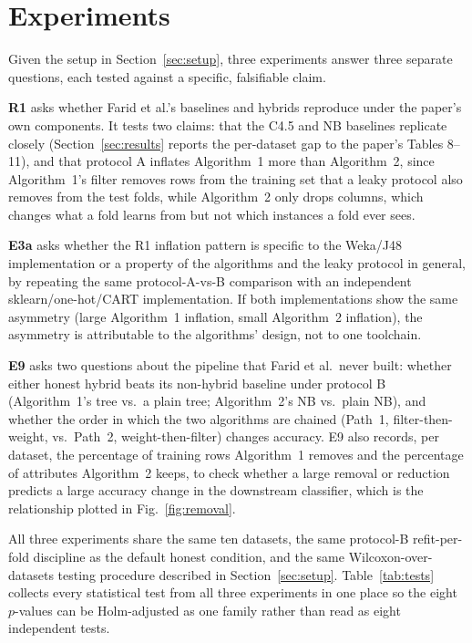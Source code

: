 \section{Experiments}
\label{sec:experiments}

Given the setup in Section~\ref{sec:setup}, three experiments answer three
separate questions, each tested against a specific, falsifiable claim.

\textbf{R1} asks whether Farid et al.'s baselines and hybrids reproduce
under the paper's own components. It tests two claims: that the C4.5 and
NB baselines replicate closely (Section~\ref{sec:results} reports the
per-dataset gap to the paper's Tables 8--11), and that protocol A inflates
Algorithm~1 more than Algorithm~2, since Algorithm~1's filter removes rows
from the training set that a leaky protocol also removes from the test
folds, while Algorithm~2 only drops columns, which changes what a fold
learns from but not which instances a fold ever sees.

\textbf{E3a} asks whether the R1 inflation pattern is specific to the
Weka/J48 implementation or a property of the algorithms and the leaky
protocol in general, by repeating the same protocol-A-vs-B comparison with
an independent sklearn/one-hot/CART implementation. If both
implementations show the same asymmetry (large Algorithm~1 inflation,
small Algorithm~2 inflation), the asymmetry is attributable to the
algorithms' design, not to one toolchain.

\textbf{E9} asks two questions about the pipeline that Farid et al.\ never
built: whether either honest hybrid beats its non-hybrid baseline under
protocol B (Algorithm~1's tree vs.\ a plain tree; Algorithm~2's NB vs.\
plain NB), and whether the order in which the two algorithms are chained
(Path~1, filter-then-weight, vs.\ Path~2, weight-then-filter) changes
accuracy. E9 also records, per dataset, the percentage of training rows
Algorithm~1 removes and the percentage of attributes Algorithm~2 keeps, to
check whether a large removal or reduction predicts a large accuracy
change in the downstream classifier, which is the relationship plotted in
Fig.~\ref{fig:removal}.

All three experiments share the same ten datasets, the same protocol-B
refit-per-fold discipline as the default honest condition, and the same
Wilcoxon-over-datasets testing procedure described in
Section~\ref{sec:setup}. Table~\ref{tab:tests} collects every statistical
test from all three experiments in one place so the eight $p$-values can
be Holm-adjusted as one family rather than read as eight independent
tests.

